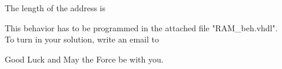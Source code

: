 \documentclass[a4paper,12pt]{article}
\begin{document}
 The length of the address is %
\begin{itemize}
\end{itemize}

This behavior has to be programmed in the attached file "RAM\_beh.vhdl".
\\

To turn in your solution, write an email to %

\vspace{0.7cm}
Good Luck and May the Force be with you.
\end{document}
